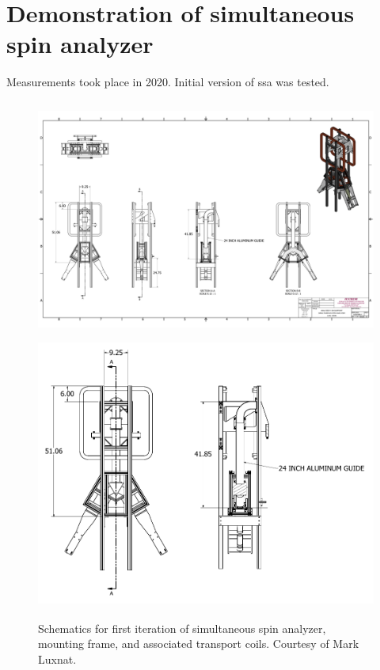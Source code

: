 
\chapter{Demonstration of simultaneous spin analyzer}\label{chap:ssa_2020}


Measurements took place in 2020. Initial version of \acrshort{ssa} was tested.

\begin{figure}
    \centering
    \includegraphics[height=3.1in]{figures/ssa_schematic_colorized.pdf}
    \includegraphics[height=3.5in]{figures/ssa_schematics.pdf}
    \caption
    {Schematics for first iteration of simultaneous spin analyzer, mounting frame, and associated transport coils. Courtesy of Mark Luxnat.}
    \label{fig:ssa_schematic}
\end{figure}

